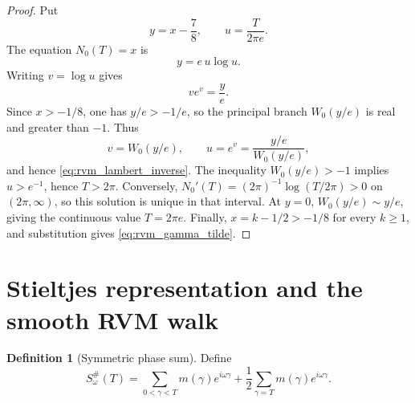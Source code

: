 \documentclass[11pt]{amsart}
\numberwithin{equation}{section}
\theoremstyle{plain}
\theoremstyle{definition}
\newtheorem{definition}[theorem]{Definition}
\theoremstyle{remark}
\newcommand{\1}{\mathbf{1}}
\begin{document}
\begin{proof}
Put
\begin{equation}
y=x-\frac78,
\qquad
u=\frac{T}{2\pi e}.
\label{eq:rvm_inverse_variables}
\end{equation}
The equation \(N_0(T)=x\) is
\begin{equation}
y=e\,u\log u.
\label{eq:rvm_inverse_step_one}
\end{equation}
Writing \(v=\log u\) gives
\begin{equation}
ve^v=\frac ye.
\label{eq:rvm_inverse_step_two}
\end{equation}
Since \(x>-1/8\), one has \(y/e>-1/e\), so the principal branch
\(W_0(y/e)\) is real and greater than \(-1\).  Thus
\begin{equation}
v=W_0(y/e),
\qquad
u=e^v=\frac{y/e}{W_0(y/e)},
\label{eq:rvm_inverse_step_three}
\end{equation}
and hence \eqref{eq:rvm_lambert_inverse}.  The inequality
\(W_0(y/e)>-1\) implies \(u>e^{-1}\), hence \(T>2\pi\).
Conversely, \(N_0'(T)=(2\pi)^{-1}\log(T/2\pi)>0\) on \((2\pi,\infty)\),
so this solution is unique in that interval.  At \(y=0\),
\(W_0(y/e)\sim y/e\), giving the continuous value \(T=2\pi e\).
Finally, \(x=k-1/2>-1/8\) for every \(k\geq1\), and substitution gives
\eqref{eq:rvm_gamma_tilde}.
\end{proof}

\section{Stieltjes representation and the smooth RVM walk}
\label{sec:stieltjes_rvm_walk}

\begin{definition}[Symmetric phase sum]
\label{def:symmetric_phase_sum}
Define
\begin{equation}
S_\omega^{\#}(T)
=
\sum_{0<\gamma<T}m(\gamma)e^{i\omega\gamma}
+
\frac12
\sum_{\gamma=T}m(\gamma)e^{i\omega\gamma}.
\label{eq:symmetric_phase_sum}
\end{equation}
\end{definition}
\end{document}
